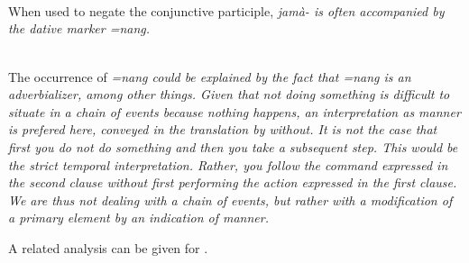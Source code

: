  \\  
 \\
 \\

When used to negate the conjunctive participle, \em jamà- \em is often accompanied by the dative marker \em =nang\em.

 
 \\
 
The occurrence of \em =nang \em could be explained by the fact that \em =nang \em is an adverbializer, among other things. Given that not doing something is difficult to situate in a chain of events because nothing happens, an interpretation as manner is prefered here, conveyed in the translation by \em without\em. It is not the case that first you do not do something and then you take a subsequent step. This would be the strict temporal interpretation. Rather, you follow the command expressed in the second clause \em without \em first performing the action expressed in the first clause. We are thus not dealing with a chain of events, but rather with a modification of a primary element by an indication of manner.

A related analysis can be given for .

